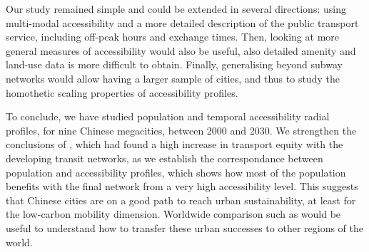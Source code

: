 \documentclass{article}
\begin{document}
Our study remained simple and could be extended in several directions: using multi-modal accessibility and a more detailed description of the public transport service, including off-peak hours and exchange times. Then, looking at more general measures of accessibility would also be useful, also detailed amenity and land-use data is more difficult to obtain. Finally, generalising beyond subway networks would allow having a larger sample of cities, and thus to study the homothetic scaling properties of accessibility profiles.

To conclude, we have studied population and temporal accessibility radial profiles, for nine Chinese megacities, between 2000 and 2030. We strengthen the conclusions of \cite{raimbault2018evolving}, which had found a high increase in transport equity with the developing transit networks, as we establish the correspondance between population and accessibility profiles, which shows how most of the population benefits with the final network from a very high accessibility level. This suggests that Chinese cities are on a good path to reach urban sustainability, at least for the low-carbon mobility dimension. Worldwide comparison such as \cite{wu2021urban} would be useful to understand how to transfer these urban successes to other regions of the world.




% 






\end{document}
